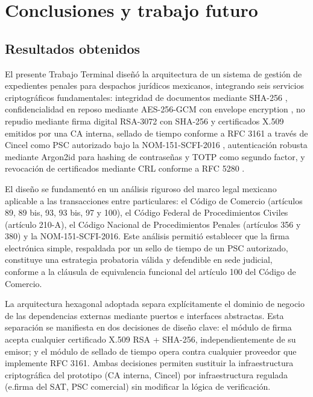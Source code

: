 \chapter{Conclusiones y trabajo futuro}\label{cap:conclusiones}

\section{Resultados obtenidos}\label{sec:resultados-obtenidos}

El presente Trabajo Terminal diseñó la arquitectura de un sistema de gestión de expedientes penales para despachos jurídicos mexicanos, integrando seis servicios criptográficos fundamentales: integridad de documentos mediante SHA-256 \cite{nist2015fips1804}, confidencialidad en reposo mediante AES-256-GCM \cite{dworkin2007} con envelope encryption \cite{dworkin2012}, no repudio mediante firma digital RSA-3072 con SHA-256 y certificados X.509 emitidos por una CA interna, sellado de tiempo conforme a RFC 3161 \cite{adams2001} a través de Cincel como PSC autorizado bajo la NOM-151-SCFI-2016 \cite{nom151_2016}, autenticación robusta mediante Argon2id \cite{biryukov2021} para hashing de contraseñas y TOTP \cite{mraihi2011} como segundo factor, y revocación de certificados mediante CRL conforme a RFC 5280 \cite{cooper2008}.

El diseño se fundamentó en un análisis riguroso del marco legal mexicano aplicable a las transacciones entre particulares: el Código de Comercio \cite{ccom2018} (artículos 89, 89 bis, 93, 93 bis, 97 y 100), el Código Federal de Procedimientos Civiles \cite{cfpc2023} (artículo 210-A), el Código Nacional de Procedimientos Penales \cite{cnpp2021} (artículos 356 y 380) y la NOM-151-SCFI-2016. Este análisis permitió establecer que la firma electrónica simple, respaldada por un sello de tiempo de un PSC autorizado, constituye una estrategia probatoria válida y defendible en sede judicial, conforme a la cláusula de equivalencia funcional del artículo 100 del Código de Comercio.

La arquitectura hexagonal adoptada separa explícitamente el dominio de negocio de las dependencias externas mediante puertos e interfaces abstractas. Esta separación se manifiesta en dos decisiones de diseño clave: el módulo de firma acepta cualquier certificado X.509 RSA + SHA-256, independientemente de su emisor; y el módulo de sellado de tiempo opera contra cualquier proveedor que implemente RFC 3161. Ambas decisiones permiten sustituir la infraestructura criptográfica del prototipo (CA interna, Cincel) por infraestructura regulada (e.firma del SAT, PSC comercial) sin modificar la lógica de verificación.

